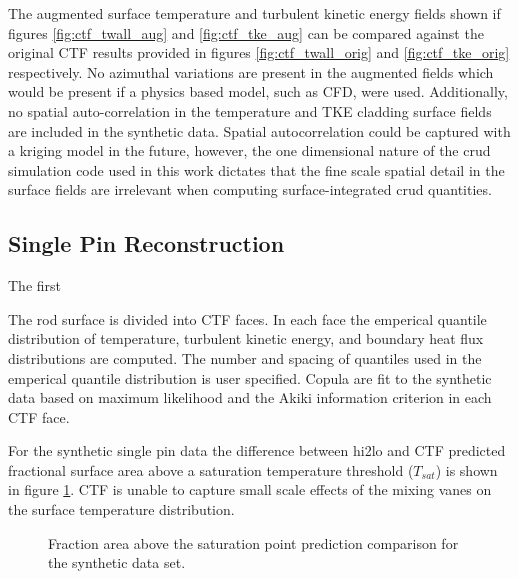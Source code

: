 The augmented surface temperature and turbulent kinetic energy fields shown if figures \ref{fig:ctf_twall_aug} and \ref{fig:ctf_tke_aug} can be compared against the original CTF results provided in figures \ref{fig:ctf_twall_orig} and \ref{fig:ctf_tke_orig} respectively.  No azimuthal variations are present in the augmented fields which would be present if a physics based model, such as CFD, were used.  Additionally, no spatial auto-correlation in the temperature and TKE cladding surface fields are included in the synthetic data.  Spatial autocorrelation could be captured with a kriging model in the future, however, the one dimensional nature of the crud simulation code used in this work dictates that the fine scale spatial detail in the surface fields are irrelevant when computing surface-integrated crud quantities.


\subsection{Single Pin Reconstruction}

The first 

The rod surface is divided into CTF faces.  In each face the emperical quantile distribution of temperature, turbulent kinetic energy, and boundary heat flux distributions are computed.  The number and spacing of quantiles used in the emperical quantile distribution is user specified.  Copula are fit to the synthetic data based on maximum likelihood and the Akiki information criterion in each CTF face.

For the synthetic single pin data the difference between hi2lo and CTF predicted fractional surface area above a saturation temperature threshold ($T_{sat}$) is shown in figure \ref{fig:frac_a}.   CTF
is unable to capture small scale effects of the mixing vanes on the surface temperature distribution.

\begin{figure}[H]%
    \centering
    \qquad
    \caption[]{Fraction area above the saturation point prediction comparison for the synthetic data set.}%
    \label{fig:frac_a}%
\end{figure}

